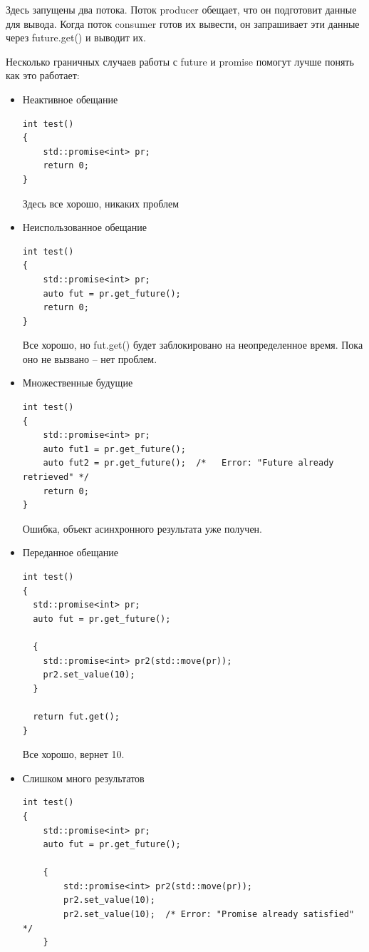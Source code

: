 \documentclass[a4paper,12pt,oneside]{article}
\begin{document}
Здесь запущены два потока. Поток producer обещает, что он подготовит данные для вывода. Когда поток consumer готов их вывести, он запрашивает эти данные через future.get() и выводит их.

Несколько граничных случаев работы с future и promise помогут лучше понять как это работает:

\begin{itemize}
\item Неактивное обещание
\begin{lstlisting}
int test()
{
    std::promise<int> pr;
    return 0;
}
\end{lstlisting}

Здесь все хорошо, никаких проблем

\item Неиспользованное обещание
\begin{lstlisting}
int test()
{
    std::promise<int> pr;
    auto fut = pr.get_future();
    return 0;
}
\end{lstlisting}

Все хорошо, но fut.get() будет заблокировано на неопределенное время. Пока оно не вызвано -- нет проблем.

\item Множественные будущие
\begin{lstlisting}
int test()
{
    std::promise<int> pr;
    auto fut1 = pr.get_future();
    auto fut2 = pr.get_future();  /*   Error: "Future already retrieved" */
    return 0;
}
\end{lstlisting}

Ошибка, объект асинхронного результата уже получен.

\item Переданное обещание
\begin{lstlisting}
int test()
{
  std::promise<int> pr;
  auto fut = pr.get_future();

  {
    std::promise<int> pr2(std::move(pr));
    pr2.set_value(10);
  }

  return fut.get();
}
\end{lstlisting}

Все хорошо, вернет 10.

\item Слишком много результатов
\begin{lstlisting}
int test()
{
    std::promise<int> pr;
    auto fut = pr.get_future();

    {
        std::promise<int> pr2(std::move(pr));
        pr2.set_value(10);
        pr2.set_value(10);  /* Error: "Promise already satisfied" */
    }


\end{lstlisting}
\end{itemize}
\end{document}
